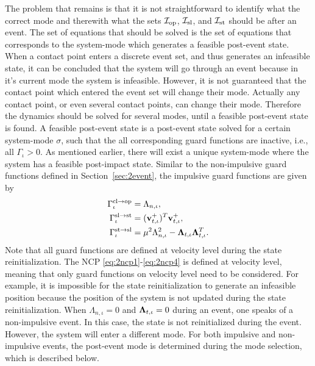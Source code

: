 \documentclass[../DC2019003Bouma.tex]{subfiles}
\begin{document}
The problem that remains is that it is not straightforward to identify what the correct mode and therewith what the sets $\mathcal{I}_{\textnormal{op}}$, $\mathcal{I}_{\textnormal{sl}}$, and $\mathcal{I}_{\textnormal{st}}$ should be after an event. The set of equations that should be solved is the set of equations that corresponds to the system-mode which generates a feasible post-event state. When a contact point enters a discrete event set, and thus generates an infeasible state, it can be concluded that the system will go through an event because in it's current mode the system is infeasible. However, it is not guaranteed that the contact point which entered the event set will change their mode. Actually any contact point, or even several contact points, can change their mode. Therefore the dynamics should be solved for several modes, until a feasible post-event state is found. A feasible post-event state is a post-event state solved for a certain system-mode $\sigma$, such that the all corresponding guard functions are inactive, i.e., all $\Gamma_{\iota}>0$. As mentioned earlier, there will exist a unique system-mode where the system has a feasible post-impact state. Similar to the non-impulsive guard functions defined in Section~\ref{sec:2event}, the impulsive guard functions are given by
\begin{align}
\Gamma^{\text{cl}\rightarrow\text{op}}_{\iota} &= \Lambda_{n,\iota},\\
\Gamma^{\text{sl}\rightarrow\text{st}}_{\iota} &= (\mathbf{v}^+_{t,\iota})^T\mathbf{v}^+_{t,\iota},\\
\Gamma^{\text{st}\rightarrow\text{sl}}_{\iota} &= \mu^2\Lambda_{n,\iota}^2 - \boldsymbol{\Lambda}_{t,\iota}\boldsymbol{\Lambda}_{t,\iota}^T.
\end{align}
Note that all guard functions are defined at velocity level during the state reinitialization. The NCP \eqref{eq:2ncp1}-\eqref{eq:2ncp4} is defined at velocity level, meaning that only guard functions on velocity level need to be considered. For example, it is impossible for the state reinitialization to generate an infeasible position because the position of the system is not updated during the state reinitialization. When $\Lambda_{n,\iota} = 0$ and $\boldsymbol{\Lambda}_{t,\iota} = 0$ during an event, one speaks of a non-impulsive event. In this case, the state is not reinitialized during the event. However, the system will enter a different mode. For both impulsive and non-impulsive events, the post-event mode is determined during the mode selection, which is described below.
\end{document}
